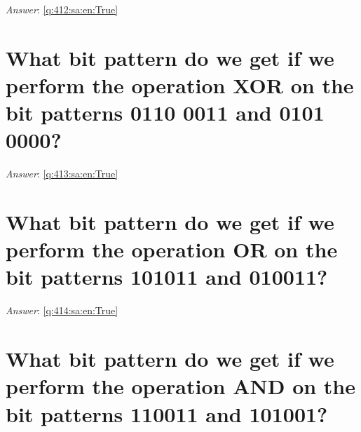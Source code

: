 \documentclass[a4paper,11pt,oneside]{book}
\begin{document}
\begin{sloppypar}
\label{q:412:sa:en:False}

\vspace{2cm}

\noindent\makebox[\textwidth]{\hrulefill}

\vspace{1cm}

\textit{Answer}: \autoref{q:412:sa:en:True}



\section{What bit pattern do we get if we perform the operation XOR on the bit patterns 0110 0011 and 0101 0000?}

\label{q:413:sa:en:False}

\vspace{2cm}

\noindent\makebox[\textwidth]{\hrulefill}

\vspace{1cm}

\textit{Answer}: \autoref{q:413:sa:en:True}



\section{What bit pattern do we get if we perform the operation OR on the bit patterns 101011 and 010011?}

\label{q:414:sa:en:False}

\vspace{2cm}

\noindent\makebox[\textwidth]{\hrulefill}

\vspace{1cm}

\textit{Answer}: \autoref{q:414:sa:en:True}



\section{What bit pattern do we get if we perform the operation AND on the bit patterns 110011 and 101001?}

\label{q:415:sa:en:False}

\vspace{2cm}

\noindent\makebox[\textwidth]{\hrulefill}

\vspace{1cm}


\end{sloppypar}
\end{document}

